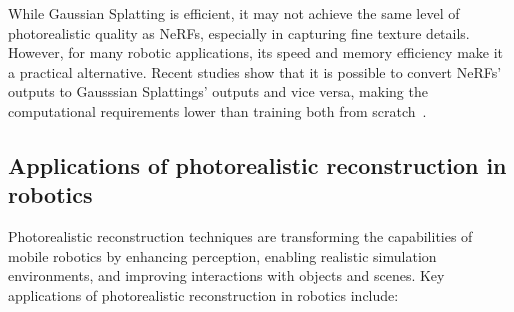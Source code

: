 While Gaussian Splatting is efficient, it may not achieve the same level of photorealistic quality as NeRFs, especially in capturing fine texture details. However, for many robotic applications, its speed and memory efficiency make it a practical alternative. Recent studies show that it is possible to convert NeRFs' outputs to Gausssian Splattings' outputs and vice versa, making the computational requirements lower than training both from scratch~\cite{nerf_gsplat_convert}.

\subsection{Applications of photorealistic reconstruction in robotics}

Photorealistic reconstruction techniques are transforming the capabilities of mobile robotics by enhancing perception, enabling realistic simulation environments, and improving interactions with objects and scenes. Key applications of photorealistic reconstruction in robotics include:

